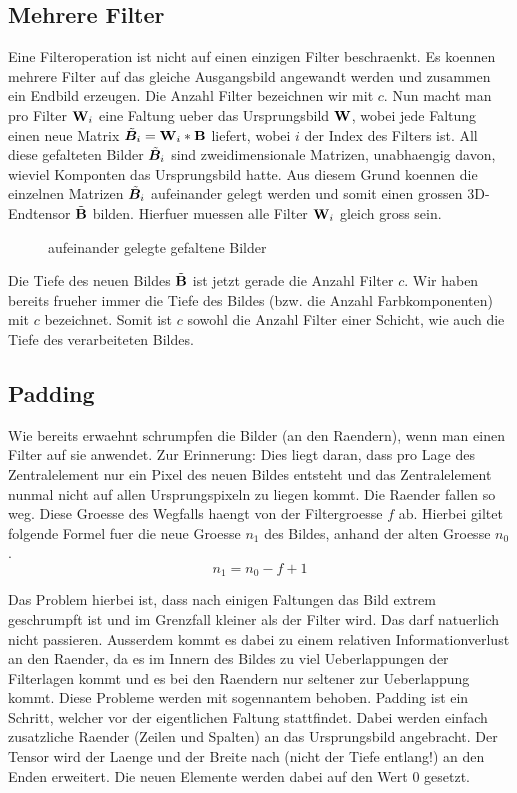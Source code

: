 \subsection{Mehrere Filter}
Eine Filteroperation ist nicht auf einen einzigen Filter beschraenkt. Es koennen
mehrere Filter auf das gleiche Ausgangsbild angewandt werden und zusammen ein
Endbild erzeugen.
\para{}
Die Anzahl Filter bezeichnen wir mit $c$.
Nun macht man pro Filter $\mathbf{W}_i$ eine Faltung ueber das Ursprungsbild $\mathbf{W}$, wobei
jede Faltung einen neue Matrix $\tilde{\bm{B}}_i = \mathbf{W}_i * \mathbf{B}$ liefert, wobei $i$ der Index des
Filters ist. All diese gefalteten Bilder $\tilde{\bm{B}}_i$ sind zweidimensionale Matrizen, unabhaengig davon, wieviel
Komponten das Ursprungsbild hatte. Aus diesem Grund koennen die einzelnen
Matrizen $\tilde{\bm{B}}_i$ aufeinander gelegt werden und somit einen grossen 3D-Endtensor
$\tilde{\mathbf{B}}$ bilden.
Hierfuer muessen alle Filter $\mathbf{W}_i$ gleich gross sein.
\begin{figure}[h!]
  \caption{aufeinander gelegte gefaltene Bilder}

\end{figure}
Die Tiefe des neuen Bildes $\tilde{\mathbf{B}}$ ist jetzt gerade die Anzahl Filter $c$.
Wir haben bereits frueher immer die Tiefe des Bildes (bzw. die Anzahl
Farbkomponenten) mit $c$ bezeichnet. Somit ist $c$ sowohl die Anzahl Filter
einer Schicht, wie auch die Tiefe des verarbeiteten Bildes.

\subsection{Padding}
Wie bereits erwaehnt schrumpfen die Bilder (an den Raendern), wenn man einen Filter auf sie anwendet.
Zur Erinnerung: Dies liegt daran, dass pro Lage des Zentralelement nur ein Pixel
des neuen Bildes entsteht und das Zentralelement nunmal nicht auf allen
Ursprungspixeln zu liegen kommt. Die Raender fallen so weg. Diese Groesse des
Wegfalls haengt von der Filtergroesse $f$ ab. Hierbei giltet folgende Formel fuer die
neue Groesse $n_1$ des Bildes, anhand der alten Groesse $n_0$.
\begin{equation}
  n_1 = n_0 - f + 1
\end{equation}

Das Problem hierbei ist, dass nach einigen Faltungen das Bild extrem geschrumpft
ist und im Grenzfall kleiner als der Filter wird. Das darf natuerlich nicht
passieren. Ausserdem kommt es dabei zu einem relativen Informationverlust an den Raender, da es im
Innern des Bildes zu viel Ueberlappungen der Filterlagen kommt und es bei den
Raendern nur seltener zur Ueberlappung kommt.
\para{}
Diese Probleme werden mit sogennantem  behoben. Padding ist ein
Schritt, welcher vor der eigentlichen Faltung stattfindet. Dabei werden einfach
zusatzliche Raender (Zeilen und Spalten) an das Ursprungsbild angebracht. Der
Tensor wird der Laenge und der Breite nach (nicht der Tiefe entlang!) an den Enden erweitert. Die neuen Elemente werden dabei auf den Wert
$0$ gesetzt.

